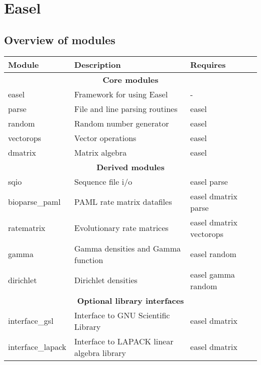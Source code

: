 \documentclass[11pt]{article}
\begin{document}




\newpage
\tableofcontents
\newpage

\section{Easel}

\subsection{Overview of modules}
\begin{tabular}{lll}\hline
\textbf{Module}            & \textbf{Description}                       & \textbf{Requires}\\\hline
  \multicolumn{3}{c}{\textbf{Core modules}}\\
easel                      & Framework for using Easel                  &  - \\
parse                      & File and line parsing routines             & easel\\
random                     & Random number generator                    & easel\\
vectorops                  & Vector operations                          & easel\\
dmatrix                    & Matrix algebra                             & easel\\ \hline
  \multicolumn{3}{c}{\textbf{Derived modules}}\\
sqio                       & Sequence file i/o                          & easel parse\\
bioparse\_paml             & PAML rate matrix datafiles                 & easel dmatrix parse \\
ratematrix                 & Evolutionary rate matrices                 & easel dmatrix vectorops\\
gamma                      & Gamma densities and Gamma function         & easel random\\
dirichlet                  & Dirichlet densities                        & easel gamma random\\ \hline     
  \multicolumn{3}{c}{\textbf{Optional library interfaces}}\\
interface\_gsl             & Interface to GNU Scientific Library        & easel dmatrix\\
interface\_lapack          & Interface to LAPACK linear algebra library & easel dmatrix \\\hline
\end{tabular}
\end{document}
